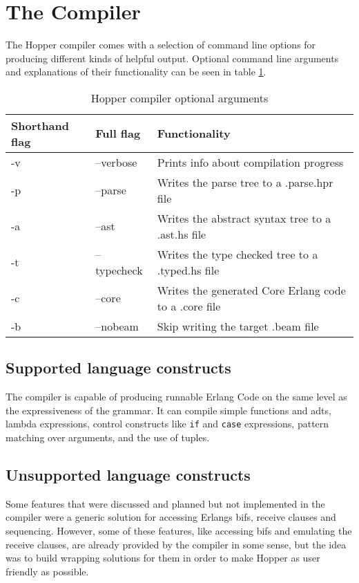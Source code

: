 \section{The Compiler}



The Hopper compiler comes with a selection of command line options for producing different kinds of helpful output. Optional command line arguments and explanations of their functionality can be seen in table \ref{tab:flags}.

\begin{table}[!htb]
\centering
\begin{tabular}{| l | l | l |}
\hline
Shorthand flag & Full flag   & Functionality\\
\hline
-v             & --verbose   & Prints info about compilation progress\\
-p             & --parse     & Writes the parse tree to a .parse.hpr file\\
-a             & --ast       & Writes the abstract syntax tree to a .ast.hs file\\
-t             & --typecheck & Writes the type checked tree to a .typed.hs file\\
-c             & --core      & Writes the generated Core Erlang code to a .core file\\
-b             & --nobeam    & Skip writing the target .beam file\\
\hline
\end{tabular}
\caption[Hopper compiler optional arguments]{Hopper compiler optional arguments}
\label{tab:flags}
\end{table}

\subsection{Supported language constructs}
The compiler is capable of producing runnable Erlang Code on the same level as the expressiveness of the grammar. It can compile simple functions and \glspl{adt}, lambda expressions, control constructs like \texttt{if} and \texttt{case} expressions, pattern matching over arguments, and the use of tuples.

\subsection{Unsupported language constructs}

Some features that were discussed and planned but not implemented in the compiler were a generic solution for accessing Erlangs \glspl{bif}, receive clauses and sequencing. However, some of these features, like accessing \glspl{bif} and emulating the receive clauses, are already provided by the compiler in some sense, but the idea was to build wrapping solutions for them in order to make Hopper as user friendly as possible.